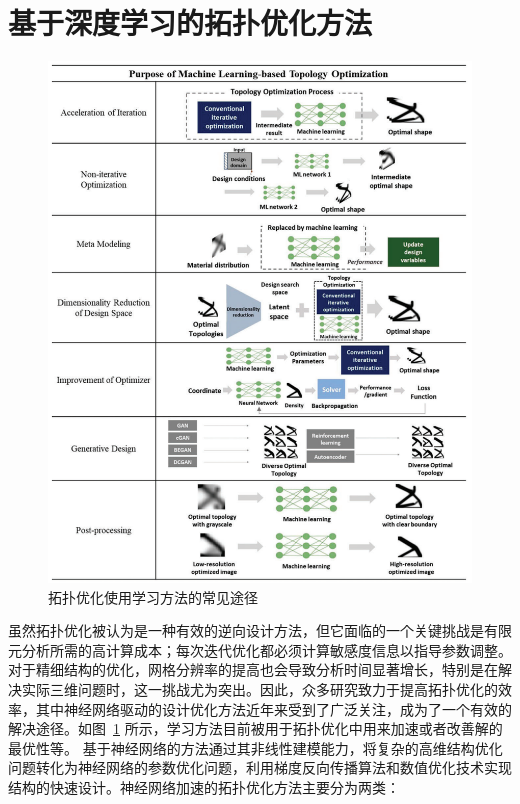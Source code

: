 \section{基于深度学习的拓扑优化方法}
\begin{figure}[htbp]
    \centering
    \includegraphics[width=1.0\linewidth]{figures/TOwDL.png}
    \caption{拓扑优化使用学习方法的常见途径~\cite{shin2023topology}}
    \label{fig:TOwDL}
\end{figure}
虽然拓扑优化被认为是一种有效的逆向设计方法，但它面临的一个关键挑战是有限元分析所需的高计算成本；每次迭代优化都必须计算敏感度信息以指导参数调整。对于精细结构的优化，网格分辨率的提高也会导致分析时间显著增长，特别是在解决实际三维问题时，这一挑战尤为突出。因此，众多研究致力于提高拓扑优化的效率，其中神经网络驱动的设计优化方法近年来受到了广泛关注，成为了一个有效的解决途径。如图~\ref{fig:TOwDL} 所示，学习方法目前被用于拓扑优化中用来加速或者改善解的最优性等。
基于神经网络的方法通过其非线性建模能力，将复杂的高维结构优化问题转化为神经网络的参数优化问题，利用梯度反向传播算法和数值优化技术实现结构的快速设计。神经网络加速的拓扑优化方法主要分为两类：

